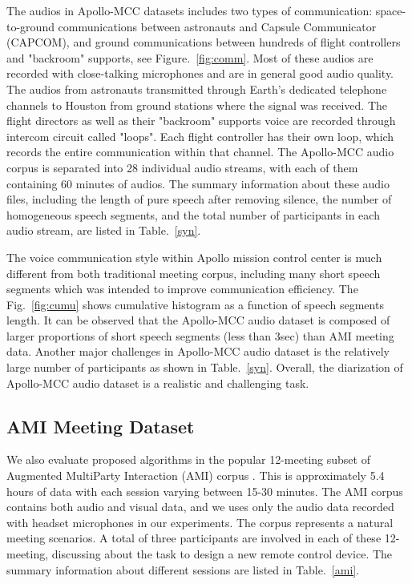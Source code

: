 \documentclass[journal,10pt]{IEEEtran}
\begin{document}
The audios in Apollo-MCC datasets includes two types of communication: space-to-ground communications between astronauts and Capsule Communicator (CAPCOM), and ground communications between hundreds of flight controllers and "backroom" supports, see Figure.~\ref{fig:comm}. Most of these audios are recorded with close-talking microphones and are in general good audio quality. The audios from astronauts transmitted through Earth's dedicated telephone channels to Houston from ground stations where the signal was received. The flight directors as well as their "backroom" supports voice are recorded through intercom circuit called "loops". Each flight controller has their own loop, which records the entire communication within that channel. The Apollo-MCC audio corpus is separated into 28 individual audio streams, with each of them containing 60 minutes of audios. The summary information about these audio files, including the length of pure speech after removing silence, the number of homogeneous speech segments, and the total number of participants in each audio stream, are listed in Table.~\ref{syn}.

The voice communication style within Apollo mission control center is much different from both traditional meeting corpus, including many short speech segments which was intended to improve communication efficiency. The Fig.~\ref{fig:cumu} shows cumulative histogram as a function of speech segments length. It can be observed that the Apollo-MCC audio dataset is composed of larger proportions of short speech segments (less than 3sec) than AMI meeting data. Another major challenges in Apollo-MCC audio dataset is the relatively large number of participants as shown in Table.~\ref{syn}. Overall, the diarization of Apollo-MCC audio dataset is a realistic and challenging task.

\subsection{AMI Meeting Dataset}
We also evaluate proposed algorithms in the popular 12-meeting subset of Augmented MultiParty Interaction (AMI) corpus \cite{mccowan2005ami,gonina2011fast}. This is approximately 5.4 hours of data with each session varying between 15-30 minutes. The AMI corpus contains both audio and visual data, and we uses only the audio data recorded with headset microphones in our experiments. The corpus represents a natural meeting scenarios. A total of three participants are involved in each of these 12-meeting, discussing about the task to design a new remote control device.  The summary information about different sessions are listed in Table.~\ref{ami}.
\end{document}
